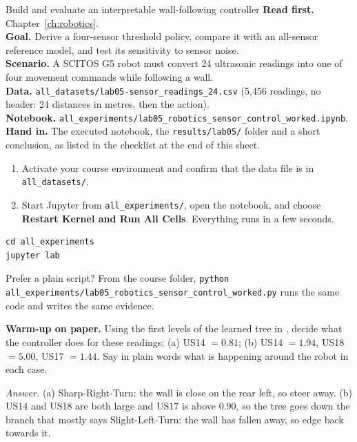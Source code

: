 
\begin{labproject}{Build and evaluate an interpretable wall-following controller}
\textbf{Read first.} Chapter~\ref{ch:robotics}.\\
\textbf{Goal.} Derive a four-sensor threshold policy, compare it with an all-sensor reference model, and test its sensitivity to sensor noise.\\
\textbf{Scenario.} A SCITOS G5 robot must convert 24 ultrasonic readings into one of four movement commands while following a wall.\\
\textbf{Data.} \texttt{all\_datasets/lab05-sensor\_readings\_24.csv} (5,456 readings, no header: 24 distances in metres, then the action).\\
\textbf{Notebook.} \texttt{all\_experiments/lab05\_robotics\_sensor\_control\_worked.ipynb}.\\
\textbf{Hand in.} The executed notebook, the \texttt{results/lab05/} folder and a short conclusion, as listed in the checklist at the end of this sheet.
\end{labproject}

\begin{labmode}
\begin{enumerate}
  \item Activate your course environment and confirm that the data file is in \texttt{all\_datasets/}.
  \item Start Jupyter from \texttt{all\_experiments/}, open the notebook, and choose \textbf{Restart Kernel and Run All Cells}. Everything runs in a few seconds.
\end{enumerate}
\begin{lstlisting}[style=utpterminal]
cd all_experiments
jupyter lab
\end{lstlisting}
Prefer a plain script? From the course folder, \texttt{python all\_experiments/lab05\_robotics\_sensor\_control\_worked.py} runs the same code and writes the same evidence.
\end{labmode}



\labroutine

\begin{yourturn}
\textbf{Warm-up on paper.} Using the first levels of the learned tree in , decide what the controller does for these readings: (a) US14 $=0.81$; (b) US14 $=1.94$, US18 $=5.00$, US17 $=1.44$. Say in plain words what is happening around the robot in each case.

\emph{Answer.} (a) Sharp-Right-Turn: the wall is close on the rear left, so steer away. (b) US14 and US18 are both large and US17 is above 0.90, so the tree goes down the branch that mostly says Slight-Left-Turn: the wall has fallen away, so edge back towards it.
\end{yourturn}

